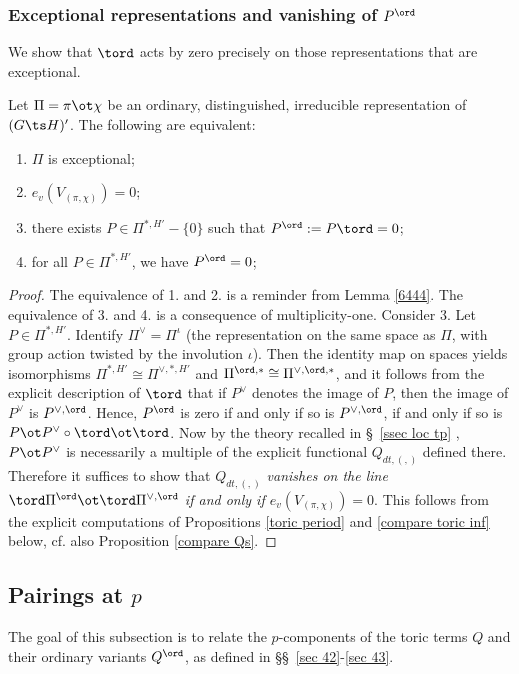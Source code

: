 \subsubsection{Exceptional representations and vanishing of $P^{\ord}$}   We show that $\tord$ acts by zero precisely on those representations that are exceptional.
\begin{lemm} 
Let $\Pi=\pi\ot\chi$ be an ordinary, distinguished, irreducible representation of $(G\ts H)'$.  The following are equivalent:
\begin{enumerate}
\item $\Pi$ is exceptional;
\item $e_{v}(V_{(\pi, \chi)}) = 0$;
\item there exists $P\in \Pi^{*, H'} -\{ 0\}$ such that $P^{\ord}:=P \tord=0$;
\item for all $P\in \Pi^{*, H'}$,  we have $P^{\ord}=0$;
\end{enumerate}
\end{lemm}
\begin{proof} The equivalence of 1. and 2. is  a reminder from  Lemma \ref{6444}. The equivalence of 3. and 4. is a consequence of multiplicity-one. Consider 3. Let $P\in \Pi^{*, H'}$. Identify  $\Pi^{\vee}=\Pi^{\iota}$ (the representation on the same space as $\Pi$, with group action twisted by the involution $\iota$). Then  the identity map on spaces yields  isomorphisms  $\Pi^{*, H'}\cong \Pi^{\vee, *, H'}$ and $\Pi^{\ord, *}\cong \Pi^{\vee, \ord, *}$, and it follows from the explicit description of $\tord$ that if $P^{\vee}$ denotes the image of $P$, then the image of $P^{\vee}$ is  $P^{\vee,\ord}$.  Hence,  $P^{\ord}$ is zero if and only if so is $P^{\vee, \ord}$, if and only if so is $P\ot P^{\vee}\circ \tord \ot \tord$. Now by the theory recalled in \S~\ref{ssec loc tp} , $P \ot P^{\vee}$ is necessarily a multiple of the explicit functional $Q_{dt, (, )}$ defined there. Therefore  it suffices to show that \emph{$Q_{dt, (, )}$ vanishes on the line $\tord \Pi^{\ord}\ot \tord \Pi^{\vee, \ord}$ if and only if $e_{v}(V_{(\pi, \chi)}) = 0$}. This follows from the explicit computations of Propositions \ref{toric period} and \ref{compare toric inf} below, cf. also Proposition \ref{compare Qs}.
\end{proof}





\subsection{Pairings at $p$}
The goal of this subsection is to relate the $p$-components of the toric terms  $Q$ and their ordinary variants $Q^{\ord}$, as defined in \S\S~\ref{sec 42}-\ref{sec 43}.


